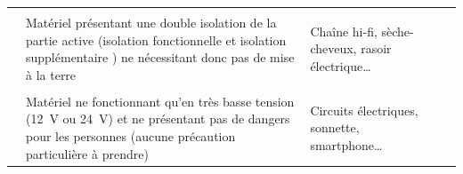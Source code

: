\begin{xltabular}{\textwidth}{l X p{3cm} p{2cm} c}
\addlinespace
{} \\
\middashrule		
		& Matériel présentant une double isolation de la partie active  (isolation fonctionnelle  et isolation supplémentaire ) ne nécessitant donc pas de mise à la terre			& Chaîne hi-fi, sèche-cheveux, rasoir électrique\ldots		& 		&  \\
\addlinespace
{} \\
\middashrule		
		& Matériel ne fonctionnant qu'en très basse tension (\SI{12}{\volt}	ou \SI{24}{\volt}) et ne présentant pas de dangers pour les personnes (aucune précaution particulière à prendre)			& Circuits électriques, sonnette, smartphone\ldots		& 		& 
\end{xltabular}

